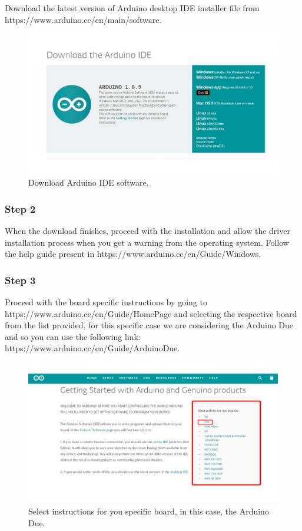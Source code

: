 \begin{refsection}
	Download the latest version of Arduino desktop IDE installer file from https://www.arduino.cc/en/main/software.
	
	\begin{figure}[H]
		\centering
		\includegraphics[width=0.86\linewidth]{./sdf/arduino_quantum_rx/figures/arduinoDownload.pdf}
		\caption{Download Arduino IDE software.}
		\label{arduinoDownload}
	\end{figure}
	
	
	\subsubsection{Step 2}
	
	When the download finishes, proceed with the installation and allow the driver installation process when you get a warning from the operating system. Follow the help guide present in https://www.arduino.cc/en/Guide/Windows.
	
	\subsubsection{Step 3}
	
	Proceed with the board specific instructions by going to https://www.arduino.cc/en/Guide/HomePage and selecting the respective board from the list provided, for this specific case we are considering the Arduino Due and so you can use the following link: https://www.arduino.cc/en/Guide/ArduinoDue.
	
	\begin{figure}[H]
		\centering
		\includegraphics[width=1\linewidth]{./sdf/arduino_quantum_rx/figures/arduinoBoards.pdf}
		\caption{Select instructions for you specific board, in this case, the Arduino Due.}
		\label{arduinoDownload}
	\end{figure}
	

\end{refsection}
